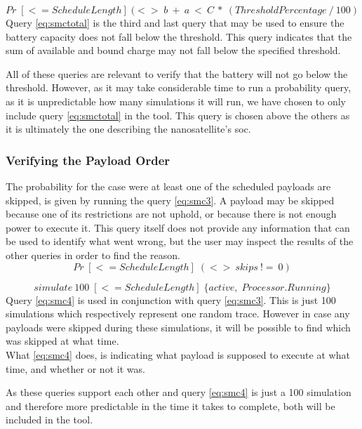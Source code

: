 \begin{equation} \label{eq:smctotal}
	Pr\; [<=ScheduleLength] \; (<>\; b\ +\ a\ <\ C\ *\ (ThresholdPercentage\ /\ 100)
\end{equation}
Query \ref{eq:smctotal} is the third and last query that may be used to ensure the battery capacity does not fall below the threshold.
This query indicates that the sum of available and bound charge may not fall below the specified threshold.

All of these queries are relevant to verify that the battery will not go below the threshold.
However, as it may take considerable time to run a probability query, as it is unpredictable how many simulations it will run, we have chosen to only include query \ref{eq:smctotal} in the tool.
This query is chosen above the others as it is ultimately the one describing the nanosatellite's \gls{soc}.

\subsubsection*{Verifying the Payload Order}
The probability for the case were at least one of the scheduled payloads are skipped, is given by running the query \ref{eq:smc3}.
A payload may be skipped because one of its restrictions are not uphold, or because there is not enough power to execute it.
This query itself does not provide any information that can be used to identify what went wrong, but the user may inspect the results of the other queries in order to find the reason.
\begin{equation} \label{eq:smc3}
Pr\; [<=ScheduleLength] \; (<> \ skips \ !=\ 0)
\end{equation}

\begin{equation} \label{eq:smc4}
	simulate\ 100 \; [<=ScheduleLength] \; \{active, \; Processor.Running\}
\end{equation}
Query \ref{eq:smc4} is used in conjunction with query \ref{eq:smc3}.
This is just 100 simulations which respectively represent one random trace.
However in case any payloads were skipped during these simulations, it will be possible to find which was skipped at what time.\\
What \ref{eq:smc4} does, is indicating what payload is supposed to execute at what time, and whether or not it was.

As these queries support each other and query \ref{eq:smc4} is just a 100 simulation and therefore more predictable in the time it takes to complete, both will be included in the tool.

